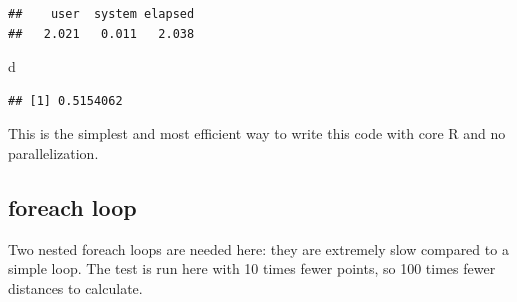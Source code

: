 \documentclass[
  12pt,
  american,
  a4paper,
  extrafontsizes,onecolumn,openright
  ]{memoir}
\newenvironment{Shaded}{\begin{snugshade}}{\end{snugshade}}
\newcommand{\AttributeTok}[1]{\textcolor[rgb]{0.77,0.63,0.00}{#1}}
\newcommand{\ControlFlowTok}[1]{\textcolor[rgb]{0.13,0.29,0.53}{\textbf{#1}}}
\newcommand{\DecValTok}[1]{\textcolor[rgb]{0.00,0.00,0.81}{#1}}
\newcommand{\FunctionTok}[1]{\textcolor[rgb]{0.00,0.00,0.00}{#1}}
\newcommand{\NormalTok}[1]{#1}
\newcommand{\OtherTok}[1]{\textcolor[rgb]{0.56,0.35,0.01}{#1}}
\newcommand{\SpecialCharTok}[1]{\textcolor[rgb]{0.00,0.00,0.00}{#1}}
\newcommand{\StringTok}[1]{\textcolor[rgb]{0.31,0.60,0.02}{#1}}
\begin{document}
\begin{verbatim}
##    user  system elapsed 
##   2.021   0.011   2.038
\end{verbatim}

\begin{Shaded}
\begin{Highlighting}[]
\NormalTok{d}
\end{Highlighting}
\end{Shaded}

\begin{verbatim}
## [1] 0.5154062
\end{verbatim}

\normalsize

This is the simplest and most efficient way to write this code with core R and no parallelization.

\hypertarget{foreach-loop}{%
\subsection{foreach loop}\label{foreach-loop}}

Two nested foreach loops are needed here: they are extremely slow compared to a simple loop.
The test is run here with 10 times fewer points, so 100 times fewer distances to calculate.

\scriptsize

\begin{Shaded}
\end{Shaded}
\end{document}
